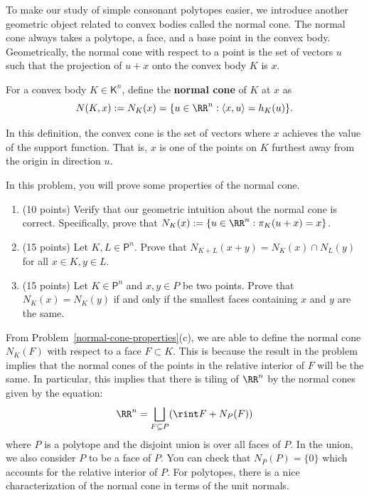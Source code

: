 \documentclass[11pt]{article}
\begin{document}
To make our study of simple consonant polytopes easier, we introduce another geometric object related to convex bodies called the normal cone. The normal cone always takes a polytope, a face, and a base point in the convex body. Geometrically, the normal cone with respect to a point is the set of vectors $u$ such that the projection of $u + x$ onto the convex body $K$ is $x$. 

\begin{defn}
    For a convex body $K \in \mathsf{K}^n$, define the \textbf{normal cone} of $K$ at $x$ as 
    \[
        N(K, x) := N_K(x) = \{u \in \RR^n : \langle x, u \rangle = h_K(u) \}.    
    \]
\end{defn}

In this definition, the convex cone is the set of vectors where $x$ achieves the value of the support function. That is, $x$ is one of the points on $K$ furthest away from the origin in direction $u$. 

\begin{prob} [40 points] \label{normal-cone-properties}
    In this problem, you will prove some properties of the normal cone. 
    \begin{enumerate}[label = (\alph*)]
        \item (10 points) Verify that our geometric intuition about the normal cone is correct. Specifically, prove that $N_K(x) := \{u \in \RR^n : \pi_K(u + x) = x\}$. 
        \item (15 points) Let $K, L \in \mathsf{P}^n$. Prove that $N_{K+L}(x+y) = N_K(x) \cap N_L(y)$ for all $x \in K, y \in L$.
        \item (15 points) Let $K \in \mathsf{P}^n$ and $x, y \in P$ be two points. Prove that $N_K(x) = N_K(y)$ if and only if the smallest faces containing $x$ and $y$ are the same. 
    \end{enumerate}
\end{prob}
From Problem~\ref{normal-cone-properties}(c), we are able to define the normal cone $N_K(F)$ with respect to a face $F \subset K$. This is because the result in the problem implies that the normal cones of the points in the relative interior of $F$ will be the same. In particular, this implies that there is tiling of $\RR^n$ by the normal cones given by the equation:
\[
    \RR^n = \bigsqcup_{F \subseteq P} (\rint F + N_P(F))    
\]
where $P$ is a polytope and the disjoint union is over all faces of $P$. In the union, we also consider $P$ to be a face of $P$. You can check that $N_P(P) = \{0\}$ which accounts for the relative interior of $P$. For polytopes, there is a nice characterization of the normal cone in terms of the unit normals.
\end{document}
